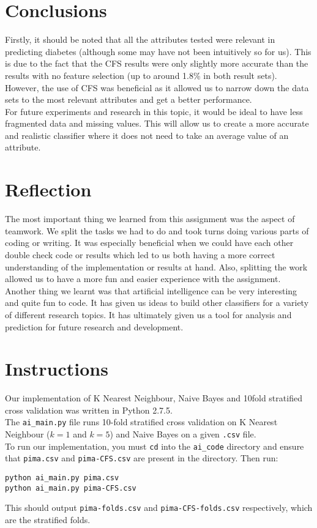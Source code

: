 \documentclass{article}
\renewcommand{\tt}{\texttt}
\begin{document}
\section{Conclusions}
Firstly, it should be noted that all the attributes tested were relevant in predicting diabetes (although some may have not been intuitively so for us). This is due to the fact that the CFS results were only slightly more accurate than the results with no feature selection (up to around 1.8\% in both result sets). However, the use of CFS was beneficial as it allowed us to narrow down the data sets to the most relevant attributes and get a better performance.  \\

For future experiments and research in this topic, it would be ideal to have less fragmented data and missing values. This will allow us to create a more accurate and realistic classifier where it does not need to take an average value of an attribute. \\

\section{Reflection}
The most important thing we learned from this assignment was the aspect of teamwork. We split the tasks we had to do and took turns doing various parts of coding or writing. It was especially beneficial when we could have each other double check code or results which led to us both having a more correct understanding of the implementation or results at hand. Also, splitting the work allowed us to have a more fun and easier experience with the assignment. \\

Another thing we learnt was that artificial intelligence can be very interesting and quite fun to code. It has given us ideas to build other classifiers for a variety of different research topics. It has ultimately given us a tool for analysis and prediction for future research and development.

\section{Instructions}
Our implementation of K Nearest Neighbour, Naive Bayes and 10\-fold stratified cross validation was written in Python 2.7.5.\\

The \tt{ai\_main.py} file runs 10-fold stratified cross validation on K Nearest Neighbour ($k=1$ and $k=5$) and Naive Bayes on a given \tt{.csv} file.\\

To run our implementation, you must \tt{cd} into the \tt{ai\_code} directory and ensure that \tt{pima.csv} and \tt{pima-CFS.csv} are present in the directory. Then run:
\begin{lstlisting}
python ai_main.py pima.csv
python ai_main.py pima-CFS.csv
\end{lstlisting}

This should output \tt{pima-folds.csv} and \tt{pima-CFS-folds.csv} respectively, which are the stratified folds.
\end{document}
